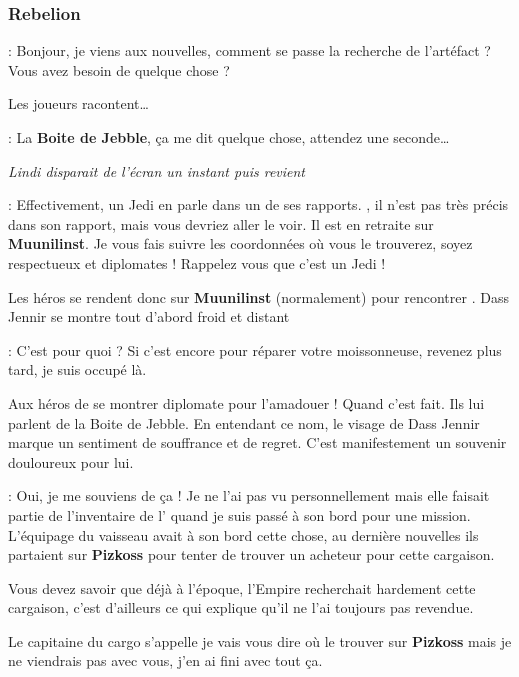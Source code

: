 \subsubsection{Rebelion}
\begin{quotebox}
    : Bonjour, je viens aux nouvelles, comment se passe la recherche de l’artéfact ? Vous avez besoin de quelque chose ?
\end{quotebox}

Les joueurs racontent\ldots

\begin{quotebox}
    : La \textbf{Boite de Jebble}, ça me dit quelque chose, attendez une seconde\ldots 

    \textit{Lindi disparait de l’écran un instant puis revient}

    : Effectivement, un Jedi en parle dans un de ses rapports. , il n’est pas très précis dans son rapport, mais vous devriez aller le voir. Il est en retraite sur \textbf{Muunilinst}. Je vous fais suivre les coordonnées où vous le trouverez, soyez respectueux et diplomates ! Rappelez vous que c’est un Jedi !
\end{quotebox}

Les héros se rendent donc sur \textbf{Muunilinst} (normalement) pour rencontrer . Dass Jennir se montre tout d’abord froid et distant
\begin{quotebox}
    : C’est pour quoi ? Si c’est encore pour réparer votre moissonneuse, revenez plus tard, je suis occupé là.
\end{quotebox}

Aux héros de se montrer diplomate pour l’amadouer ! Quand c’est fait. Ils lui parlent de la Boite de Jebble. En entendant ce nom, le visage de Dass Jennir marque un sentiment de souffrance et de regret. C’est manifestement un souvenir douloureux pour lui.
\begin{quotebox}
    : Oui, je me souviens de ça ! Je ne l’ai pas vu personnellement mais elle faisait partie de l’inventaire de l’ quand je suis passé à son bord pour une mission. L’équipage du vaisseau avait à son bord cette chose, au dernière nouvelles ils partaient sur \textbf{Pizkoss} pour tenter de trouver un acheteur pour cette cargaison.

    Vous devez savoir que déjà à l’époque, l’Empire recherchait hardement cette cargaison, c’est d’ailleurs ce qui explique qu’il ne l’ai toujours pas revendue. 

    Le capitaine du cargo s’appelle  je vais vous dire où le trouver sur \textbf{Pizkoss} mais je ne viendrais pas avec vous, j’en ai fini avec tout ça.
\end{quotebox}

